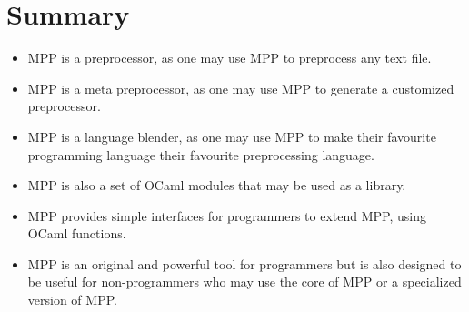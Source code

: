 \documentclass[a4paper]{article}
\begin{document}
\section{Summary}
\begin{itemize}
\item MPP is a preprocessor, as one may use MPP to preprocess any text file.

\item MPP is a meta preprocessor, as one may use MPP to generate a
  customized preprocessor.


\item MPP is a language blender, as one may use MPP to make their
  favourite programming language their favourite preprocessing
  language.

\item MPP is also a set of OCaml modules that may be used as a library.

\item MPP provides simple interfaces for programmers to extend MPP,
  using OCaml functions.

\item MPP is an original and powerful tool for programmers but is also
  designed to be useful for non-programmers who may use the core of
  MPP or a specialized version of MPP.
\end{itemize}
\end{document}
